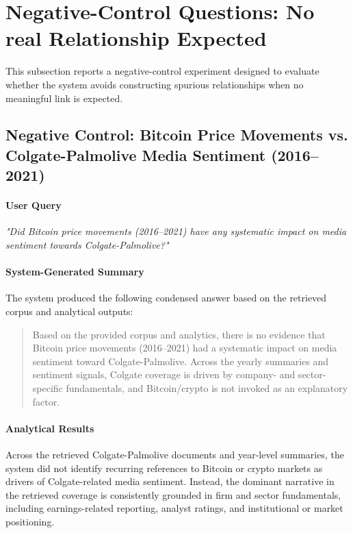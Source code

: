 \section{Negative-Control Questions: No real Relationship Expected}

This subsection reports a negative-control experiment designed to evaluate whether the system avoids constructing spurious relationships when no meaningful link is expected.

\subsection{Negative Control: Bitcoin Price Movements vs. Colgate-Palmolive Media Sentiment (2016--2021)}


\paragraph{User Query}

\textit{"Did Bitcoin price movements (2016--2021) have any systematic impact on media sentiment towards Colgate-Palmolive?"}

\paragraph{System-Generated Summary}

The system produced the following condensed answer based on the retrieved corpus and analytical outputs:

\begin{quote}
Based on the provided corpus and analytics, there is no evidence that Bitcoin price movements (2016--2021) had a systematic impact on media sentiment toward Colgate-Palmolive. Across the yearly summaries and sentiment signals, Colgate coverage is driven by company- and sector-specific fundamentals, and Bitcoin/crypto is not invoked as an explanatory factor.
\end{quote}

\paragraph{Analytical Results}

Across the retrieved Colgate-Palmolive documents and year-level summaries, the system did not identify recurring references to Bitcoin or crypto markets as drivers of Colgate-related media sentiment. Instead, the dominant narrative in the retrieved coverage is consistently grounded in firm and sector fundamentals, including earnings-related reporting, analyst ratings, and institutional or market positioning.


